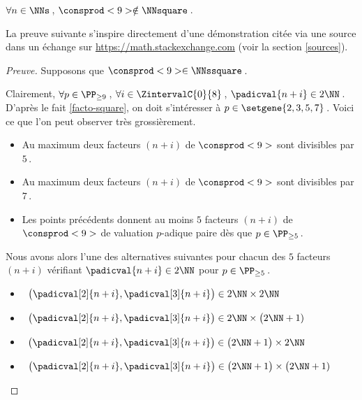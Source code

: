 \begin{fact} \label{case-9}
	 $\forall n \in \NNs$\,, $\consprod<9> \notin \NNsquare$\,.
\end{fact}




La preuve suivante s'inspire directement d'une démonstration citée via une source dans un échange sur \url{https://math.stackexchange.com} (voir la section \ref{sources}).


\begin{proof}[Preuve]%
    Supposons que $\consprod<9> \in \NNssquare$\,.
    
    \smallskip
    
    Clairement, 
    $\forall p \in \PP_{\geq 9}$\,, 
    $\forall i \in \ZintervalC{0}{8}$\,, 
    $\padicval{n + i} \in 2 \NN$\,.
    D'après le fait \ref{facto-square}, on doit s'intéresser à $p \in \setgene{2, 3, 5, 7}$\,.
    Voici ce que l'on peut observer très grossièrement.
    \begin{itemize}
		\item Au maximum deux facteurs $(n + i)$ de $\consprod<9>$ sont divisibles par $5$\,.

		\item Au maximum deux facteurs $(n + i)$ de $\consprod<9>$ sont divisibles par $7$\,.

		\item Les points précédents donnent au moins $5$ facteurs $(n + i)$ de $\consprod<9>$ de valuation $p$-adique paire dès que $p \in \PP_{\geq 5}$\,.
    \end{itemize}
    
    Nous avons alors l'une des alternatives suivantes pour chacun des $5$ facteurs $(n+i)$ vérifiant $\padicval{n + i} \in 2 \NN$ pour $p \in \PP_{\geq 5}$\,.
    \begin{itemize}
    	\smallskip
		\item {}\,
		$\big( \padicval[2]{n + i} , \padicval[3]{n + i} \big) \in 2 \NN \times 2 \NN$

    	\smallskip
		\item {}\,
		$\big( \padicval[2]{n + i} , \padicval[3]{n + i} \big) \in 2 \NN \times \big( 2 \NN + 1)$

    	\smallskip
		\item {}\,
		$\big( \padicval[2]{n + i} , \padicval[3]{n + i} \big) \in \big( 2 \NN + 1 \big) \times 2 \NN$

    	\smallskip
		\item {}\,
		$\big( \padicval[2]{n + i} , \padicval[3]{n + i} \big) \in \big( 2 \NN + 1 \big) \times \big( 2 \NN + 1)$
    \end{itemize}
    

\end{proof}
